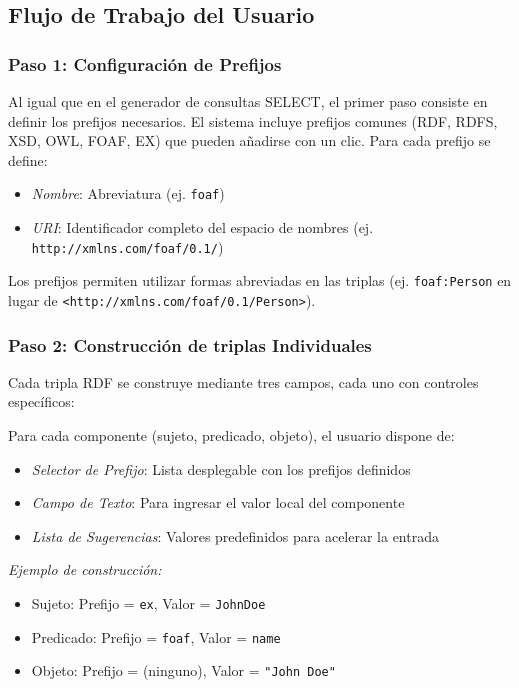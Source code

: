 \documentclass{article}
\begin{document}
\subsection{Flujo de Trabajo del Usuario}
\label{subsec:triple-workflow}

\subsubsection{Paso 1: Configuración de Prefijos}
\label{subsubsec:triple-prefix-configuration}

Al igual que en el generador de consultas SELECT, el primer paso consiste en definir los prefijos necesarios. El sistema incluye prefijos comunes (RDF, RDFS, XSD, OWL, FOAF, EX) que pueden añadirse con un clic. Para cada prefijo se define:

\begin{itemize}
    \item \textit{Nombre}: Abreviatura (ej. \texttt{foaf})
    \item \textit{URI}: Identificador completo del espacio de nombres (ej. \texttt{http://xmlns.com/foaf/0.1/})
\end{itemize}

Los prefijos permiten utilizar formas abreviadas en las triplas (ej. \texttt{foaf:Person} en lugar de \texttt{<http://xmlns.com/foaf/0.1/Person>}).

\subsubsection{Paso 2: Construcción de triplas Individuales}
\label{subsubsec:triple-construction}

Cada tripla RDF se construye mediante tres campos, cada uno con controles específicos:

Para cada componente (sujeto, predicado, objeto), el usuario dispone de:

\begin{itemize}
    \item \textit{Selector de Prefijo}: Lista desplegable con los prefijos definidos
    \item \textit{Campo de Texto}: Para ingresar el valor local del componente
    \item \textit{Lista de Sugerencias}: Valores predefinidos para acelerar la entrada
\end{itemize}

\textit{Ejemplo de construcción:}
\begin{itemize}
    \item Sujeto: Prefijo = \texttt{ex}, Valor = \texttt{JohnDoe}
    \item Predicado: Prefijo = \texttt{foaf}, Valor = \texttt{name}
    \item Objeto: Prefijo = (ninguno), Valor = \texttt{"John Doe"}
\end{itemize}
\end{document}
